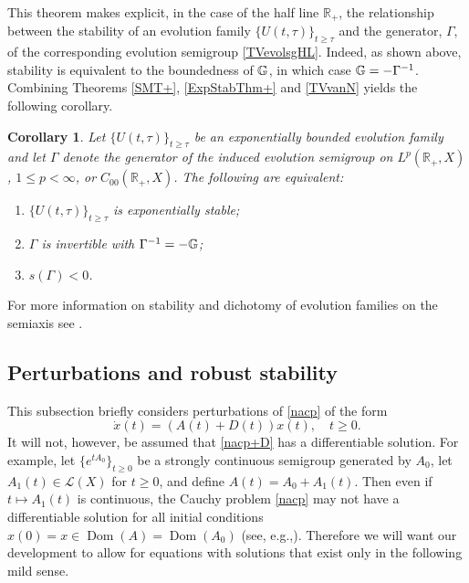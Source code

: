 \documentclass[10pt,psamsfonts,leqno]{siamltex}
\newtheorem{cor}[prop]{Corollary}
\newcommand{\bbR}{\mathbb{R}}
\newcommand{\Dom}{\operatorname{Dom}}
\newcommand{\lb}{\label}
\begin{document}
This theorem makes explicit, in the case of
the half line $\bbR_+$, the relationship between the stability of an
evolution family $\{U(t,\tau)\}_{t\ge\tau}$ and the generator, $\Gamma$,
of the corresponding evolution semigroup \eqref{TVevolsgHL}.  Indeed, as
shown above, stability is equivalent to the boundedness of $\Bbb{G}$, in
which case $\Bbb{G}=-\Gamma^{-1}$.   Combining Theorems \ref{SMT+},
\ref{ExpStabThm+} and \ref{TVvanN}
yields the following corollary.

\begin{cor}\lb{vanNCor}
Let $\{U(t,\tau)\}_{t\ge\tau}$ be an exponentially
bounded evolution family and let $\Gamma$ denote the
generator of the induced evolution semigroup on
$L^p(\bbR_+,X)$, $1\le p<\infty$, or $C_{00}(\bbR_+,X)$.
The following are equivalent:
\begin{enumerate}
\item $\{U(t,\tau)\}_{t\ge\tau}$ is exponentially stable;
\item $\Gamma$ is invertible with $\Gamma^{-1}=-\Bbb{G}$;
\item $s(\Gamma)<0$.
\end{enumerate}
\end{cor}
\noindent For more information on stability and dichotomy of
evolution families on the semiaxis see \cite{MiRaSc}.

\subsection{Perturbations and robust stability}%

This subsection briefly considers
perturbations of \eqref{nacp} of the form
\begin{equation}\lb{nacp+D}
\dot x(t)=(A(t)+D(t))x(t), \quad t\ge0.
\end{equation}
It will not, however, be assumed that \eqref{nacp+D} has a
differentiable solution.  For example,
 let $\{e^{tA_0}\}_{t\ge0}$ be a strongly continuous semigroup
generated by $A_0$, let $A_1(t)\in \mathcal{L}(X)$ for $t\ge0$,
and define $A(t)=A_0+A_1(t)$.  Then even if $t\mapsto A_1(t)$
is continuous, the Cauchy problem \eqref{nacp} may   not have
a differentiable solution for all initial conditions $x(0)=x\in
\Dom(A)=\Dom(A_0)$ (see, e.g.,\cite{Phillips}).  Therefore we will
want our development to allow for equations with solutions that
exist only in the following mild sense.
\end{document}
